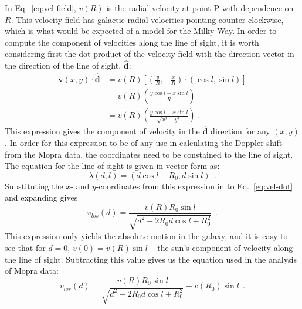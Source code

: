 \documentclass[a4paper, titlepage, oneside]{article}
\begin{document}
In Eq.~\eqref{eq:vel-field}, \(v(R)\) is the radial velocity at point P with dependence on \(R\). This velocity field has galactic radial velocities pointing counter clockwise, which is what would be expected of a model for the Milky Way. In order to compute the component of velocities along the line of sight, it is worth considering first the dot product of the velocity field with the direction vector in the direction of the line of sight, \(\mathbf{\hat{d}}\):
\begin{align}
  \mathbf{v}(x,y)\cdot\mathbf{\hat{d}}&=v(R)\left[\left(\frac{y}{R},-\frac{x}{R}\right)\!\cdot(\cos{l},\sin{l})\right] \\
  &=v(R)\left(\frac{y\cos{l}-x\sin{l}}{R}\right) \\
  &=v(R)\left(\frac{y\cos{l}-x\sin{l}}{\sqrt{x^2+y^2}}\right)\;.
  \label{eq:vel-dot}
\end{align}
This expression gives the component of velocity in the \(\mathbf{\hat{d}}\) direction for any \((x,y)\). In order for this expression to be of any use in calculating the Doppler shift from the Mopra data, the coordinates need to be constained to the line of sight. The equation for the line of sight is given in vector form as:
\begin{equation}
  \lambda(d,l)=(d\cos{l}-R_0,d\sin{l})\;\,.
\end{equation}
Substituting the \(x\)- and \(y\)-coordinates from this expression in to Eq.~\eqref{eq:vel-dot} and expanding gives
\begin{equation}
  v_{los}(d)=\frac{v(R)R_0\sin{l}}{\sqrt{d^2-2R_0d\cos{l}+R_0^2}}\;\,.
\end{equation}
This expression only yields the absolute motion in the galaxy, and it is easy to see that for \(d=0\), \(v(0)=v(R)\sin{l}\) -- the sun's component of velocity along the line of sight. Subtracting this value gives us the equation used in the analysis of Mopra data:
\begin{equation}
  v_{los}(d)=\frac{v(R)R_0\sin{l}}{\sqrt{d^2-2R_0d\cos{l}+R_0^2}}-v(R_0)\sin{l}\;\,.
\end{equation}

\printbibliography[heading = bibintoc] %
\end{document}
